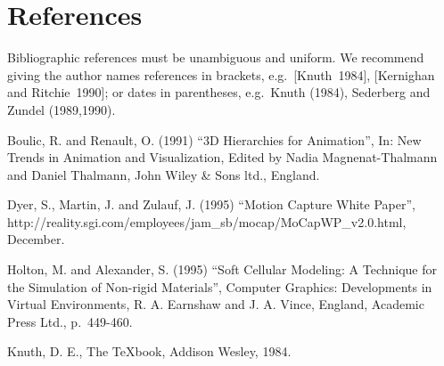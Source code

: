 \documentclass{SBCbookchapter}
\begin{document}
\section{References}
Bibliographic references must be unambiguous and uniform.  We
recommend giving the author names references in brackets,
e.g.~[Knuth~1984], [Kernighan and Ritchie~1990]; or dates in
parentheses, e.g.~Knuth (1984), Sederberg and Zundel (1989,1990).

\begin{thebibliography}{99}
 Boulic, R. and Renault, O. (1991) ``3D Hierarchies for
  Animation'', In: New Trends in Animation and Visualization, Edited
  by Nadia Magnenat-Thalmann and Daniel Thalmann, John Wiley \& Sons
  ltd., England.

 Dyer, S., Martin, J. and Zulauf, J. (1995) ``Motion
  Capture White Paper'',
  http://reality.sgi.com/employees/jam\_sb/mocap/MoCapWP\_v2.0.html,
  December.

 Holton, M. and Alexander, S. (1995) ``Soft Cellular
  Modeling: A Technique for the Simulation of Non-rigid Materials'',
  Computer Graphics: Developments in Virtual Environments, R. A.
  Earnshaw and J. A. Vince, England, Academic Press Ltd., p.~449-460.

 Knuth, D. E., The TeXbook, Addison Wesley, 1984.
\end{thebibliography}
\end{document}
